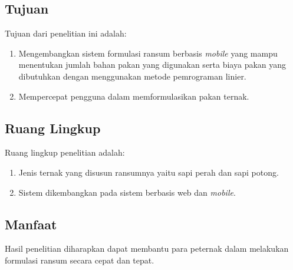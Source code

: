 \subsection*{Tujuan}
Tujuan dari penelitian ini adalah:
\begin{enumerate}[noitemsep] 
\item Mengembangkan sistem formulasi ransum berbasis \textit{mobile} yang mampu menentukan jumlah bahan pakan yang digunakan serta biaya pakan yang dibutuhkan dengan menggunakan metode pemrograman linier.
\item Mempercepat pengguna dalam memformulasikan pakan ternak.
\end{enumerate}

\subsection*{Ruang Lingkup}
Ruang lingkup penelitian adalah:
\begin{enumerate}[noitemsep] 
\item Jenis ternak yang disusun ransumnya yaitu sapi perah dan sapi potong.
\item Sistem dikembangkan pada sistem berbasis web dan \textit{mobile}. 
\end{enumerate}

\subsection*{Manfaat}
Hasil penelitian diharapkan dapat membantu para peternak dalam melakukan formulasi ransum secara cepat dan tepat.


